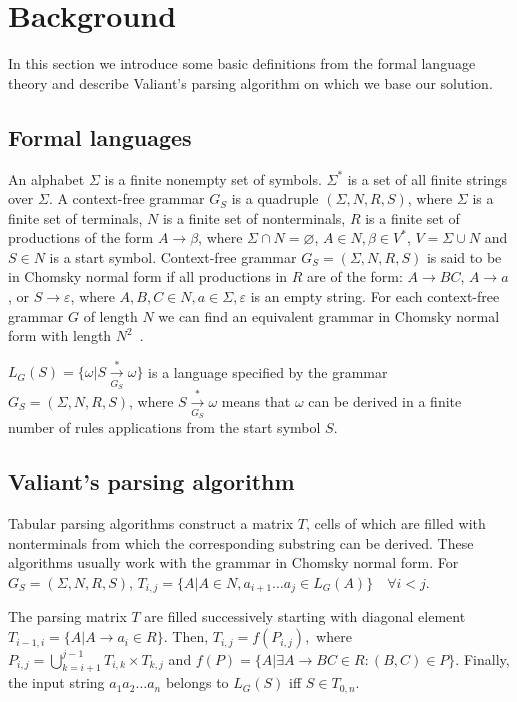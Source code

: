 \section{Background}

In this section we introduce some basic definitions from the formal language theory and describe Valiant's parsing algorithm on which we base our solution. 

\subsection{Formal languages}

An alphabet $\Sigma$ is a finite nonempty set of symbols.
$\Sigma^{*}$ is a set of all finite strings over $\Sigma$.
A context-free grammar $G_S$ is a quadruple $(\Sigma, N, R, S)$, where $\Sigma$ is a finite set of terminals, $N$ is a finite set of nonterminals, $R$ is a finite set of productions of the form $A \rightarrow \beta$, where $\Sigma \cap N = \varnothing$, $A \in N, \beta \in V^{*}$, $V = \Sigma \cup N$ and $S \in N$ is a start symbol.
Context-free grammar $G_S = (\Sigma, N, R, S)$ is said to be in Chomsky normal form if all productions in $R$ are of the form: $A \rightarrow BC$, $A \rightarrow a$, or $S \rightarrow \varepsilon$, where $A, B, C \in N, a \in \Sigma, \varepsilon$ is an empty string.
For each context-free grammar $G$ of length $N$ we can find an equivalent grammar in Chomsky normal form with length $N^2$~\cite{hopcroft2008introduction}.

$L_{G}(S) = \{ \omega | S\xrightarrow[G_S]{*} \omega\}$ is a language specified by the grammar $G_{S} = (\Sigma, N, R, S)$, where $S \xrightarrow[G_S]{*} \omega$ means that $\omega$ can be derived in a finite number of rules applications from the start symbol $S$.

\subsection{Valiant's parsing algorithm}

Tabular parsing algorithms construct a matrix $T$, cells of which are filled with nonterminals from which the corresponding substring can be derived. 
These algorithms usually work with the grammar in Chomsky normal form.
For $G_S=(\Sigma, N, R, S)$, $T_{i, j} =  \{ A | A \in N, a_{i + 1} \dots a_{j} \in L_{G}(A)\} \quad \forall i < j$.

The parsing matrix $T$ are filled successively starting with diagonal element $T_{i - 1, i} = \{ A | A \rightarrow a_{i} \in R\}.$
Then, $T_{i, j} = f(P_{i, j}),$ where
$P_{i, j} = \bigcup\limits_{k = i + 1}^{j - 1} T_{i,k} \times T_{k, j}$ and
$f(P) = \{A | \exists A \rightarrow BC \in R : (B, C) \in P\}.$
Finally, the input string $a_{1}a_{2} \dots a_{n}$ belongs to $L_{G}(S)$ iff $S \in T_{0, n}$.

